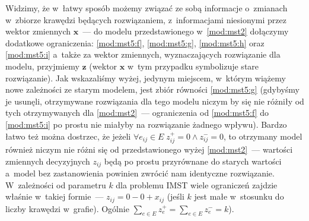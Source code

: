 Widzimy, że w~łatwy sposób możemy związać ze sobą informacje o~zmianach w~zbiorze krawędzi będących rozwiązaniem, z~informacjami niesionymi przez wektor zmiennych $\textbf{x}$~--- do modelu przedstawionego w~\ref{mod:mst2} dołączymy dodatkowe ograniczenia: \ref{mod:mst5:f}, \ref{mod:mst5:g}, \ref{mod:mst5:h} oraz \ref{mod:mst5:i} a~także za wektor zmiennych, wyznaczających rozwiązanie dla modelu, przyjmiemy $\textbf{z}$ (wektor $\textbf{x}$ w~tym przypadku symbolizuje stare rozwiązanie).
Jak wskazaliśmy wyżej, jedynym miejscem, w~którym wiążemy nowe zależności ze starym modelem, jest zbiór równości \ref{mod:mst5:g} (gdybyśmy je usunęli, otrzymywane rozwiązania dla tego modelu niczym by się nie różniły od tych otrzymywanych dla \ref{mod:mst2}~--- ograniczenia od \ref{mod:mst5:f} do \ref{mod:mst5:i} po prostu nie miałyby na rozwiązanie żadnego wpływu).
Bardzo łatwo też można dostrzec, że jeżeli $\forall e_{ij} \in E \; z_{ij}^{+} = 0 \wedge z_{ij}^{-} = 0$, to otrzymany model również niczym nie różni się od przedstawionego wyżej \ref{mod:mst2}~--- wartości zmiennych decyzyjnych $z_{ij}$ będą po prostu przyrównane do starych wartości a~model bez zastanowienia powinien zwrócić nam identyczne rozwiązanie.
W~zależności od parametru $k$ dla problemu \textsc{IMST} wiele ograniczeń zajdzie właśnie w~takiej formie~--- $z_{ij} = 0 - 0 + x_{ij}$ (jeśli $k$ jest małe w~stosunku do liczby krawędzi w~grafie).
Ogólnie $\sum_{e \in E} z_{e}^{+} = \sum_{e \in E} z_{e}^{-} = k$).

